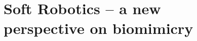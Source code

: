 \ifx\printIntroduction\undefined
\else
\chapter[Soft Robotics -- a new perspective]{Soft Robotics -- a new \\ perspective on biomimicry}
\label{chap: chapter 0}
\vspace*{-12mm}










%
%
%
%


\fi

